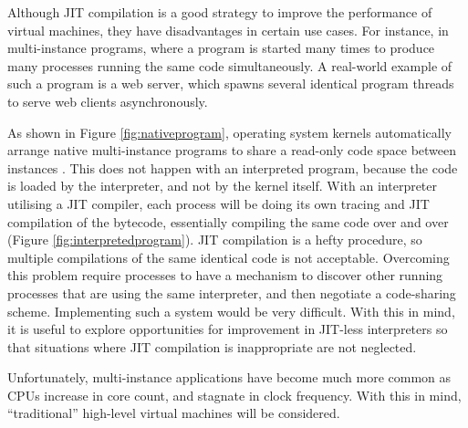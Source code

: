 		Although JIT compilation is a good strategy to improve the performance of virtual machines, they have disadvantages in certain use cases. For instance, in multi-instance programs, where a program is started many times to produce many processes running the same code simultaneously. A real-world example of such a program is a web server, which spawns several identical program threads to serve web clients asynchronously.
		
		As shown in Figure \ref{fig:nativeprogram}, operating system kernels automatically arrange native multi-instance programs to share a read-only code space between instances \citep{sharedcodepatent}. This does not happen with an interpreted program, because the code is loaded by the interpreter, and not by the kernel itself. With an interpreter utilising a JIT compiler, each process will be doing its own tracing and JIT compilation of the bytecode, essentially compiling the same code over and over (Figure \ref{fig:interpretedprogram}). JIT compilation is a hefty procedure, so multiple compilations of the same identical code is not acceptable. Overcoming this problem require processes to have a mechanism to discover other running processes that are using the same interpreter, and then negotiate a code-sharing scheme. Implementing such a system would be very difficult. With this in mind, it is useful to explore opportunities for improvement in JIT-less interpreters so that situations where JIT compilation is inappropriate are not neglected. 
		
		Unfortunately, multi-instance applications have become much more common as CPUs increase in core count, and stagnate in clock frequency. With this in mind, ``traditional'' high-level virtual machines will be considered.
		
